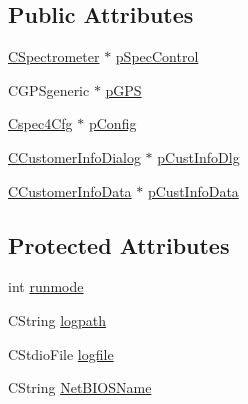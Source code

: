 \subsection*{Public Attributes}
\begin{DoxyCompactItemize}
\item 
\hyperlink{classCSpectrometer}{CSpectrometer} $\ast$ \hyperlink{classCspec4App_af9eab90ef7c5bb800561169d2165fce9}{pSpecControl}
\item 
CGPSgeneric $\ast$ \hyperlink{classCspec4App_af3740e495567311821ca3b8fbe0f10aa}{pGPS}
\item 
\hyperlink{classCspec4Cfg}{Cspec4Cfg} $\ast$ \hyperlink{classCspec4App_a4e930236aeb3c7e48f1cb2cd11678959}{pConfig}
\item 
\hyperlink{classCCustomerInfoDialog}{CCustomerInfoDialog} $\ast$ \hyperlink{classCspec4App_a2792961deb5902f72c5b8fa7a756b746}{pCustInfoDlg}
\item 
\hyperlink{classCCustomerInfoData}{CCustomerInfoData} $\ast$ \hyperlink{classCspec4App_a06bded385a1b1084d5c65725c7509b88}{pCustInfoData}
\end{DoxyCompactItemize}
\subsection*{Protected Attributes}
\begin{DoxyCompactItemize}
\item 
int \hyperlink{classCspec4App_a787077381a3617938ae9761f2aa39a1e}{runmode}
\item 
CString \hyperlink{classCspec4App_a181254d816e490e80677460212fdd019}{logpath}
\item 
CStdioFile \hyperlink{classCspec4App_ab5f5e62030d168cc83b9223f33c38049}{logfile}
\item 
CString \hyperlink{classCspec4App_a0316d29bbb6effdc7bfddc616e781a1b}{NetBIOSName}
\end{DoxyCompactItemize}


